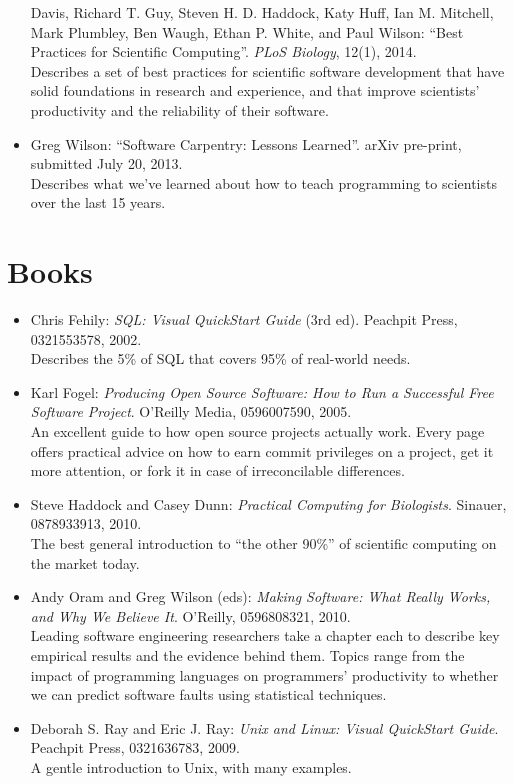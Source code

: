 \documentclass[]{book}
\begin{document}
\begin{itemize}
  Davis, Richard T. Guy, Steven H. D. Haddock, Katy Huff, Ian M.
  Mitchell, Mark Plumbley, Ben Waugh, Ethan P. White, and Paul Wilson:
  ``Best Practices for Scientific Computing''. \emph{PLoS Biology},
  12(1), 2014. \\ Describes a set of best practices for scientific
  software development that have solid foundations in research and
  experience, and that improve scientists' productivity and the
  reliability of their software.
\item
  Greg Wilson: ``Software Carpentry: Lessons Learned''. arXiv pre-print,
  submitted July 20, 2013. \\ Describes what we've learned about how to
  teach programming to scientists over the last 15 years.
\end{itemize}

\section{Books}

\begin{itemize}
\item
  Chris Fehily: \emph{SQL: Visual QuickStart Guide} (3rd ed). Peachpit
  Press, 0321553578, 2002. \\ Describes the 5\% of SQL that covers 95\%
  of real-world needs.
\item
  Karl Fogel: \emph{Producing Open Source Software: How to Run a
  Successful Free Software Project}. O'Reilly Media, 0596007590, 2005.
  \\ An excellent guide to how open source projects actually work. Every
  page offers practical advice on how to earn commit privileges on a
  project, get it more attention, or fork it in case of irreconcilable
  differences.
\item
  Steve Haddock and Casey Dunn: \emph{Practical Computing for
  Biologists}. Sinauer, 0878933913, 2010. \\ The best general
  introduction to ``the other 90\%'' of scientific computing on the
  market today.
\item
  Andy Oram and Greg Wilson (eds): \emph{Making Software: What Really
  Works, and Why We Believe It}. O'Reilly, 0596808321, 2010. \\ Leading
  software engineering researchers take a chapter each to describe key
  empirical results and the evidence behind them. Topics range from the
  impact of programming languages on programmers' productivity to
  whether we can predict software faults using statistical techniques.
\item
  Deborah S. Ray and Eric J. Ray: \emph{Unix and Linux: Visual
  QuickStart Guide}. Peachpit Press, 0321636783, 2009. \\ A gentle
  introduction to Unix, with many examples.
\end{itemize}
\end{document}
